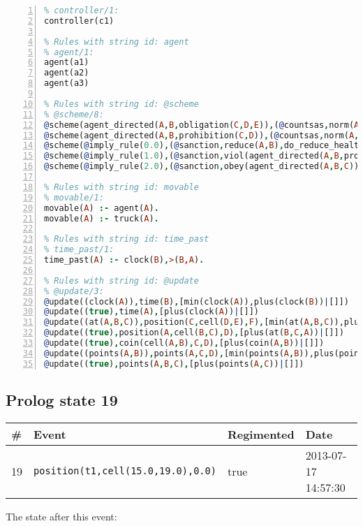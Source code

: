 \documentclass[11pt]{article}\usepackage[utf8]{inputenc}\usepackage{geometry}
\begin{document}
\begin{lstlisting}[language=Prolog, numbers=left]
% Rules with string id: controller
% controller/1:
controller(c1)

% Rules with string id: agent
% agent/1:
agent(a1)
agent(a2)
agent(a3)

% Rules with string id: @scheme
% @scheme/8:
@scheme(agent_directed(A,B,obligation(C,D,E)),(@countsas,norm(A,B,F,obligation(C,D,E)),F),false,(listTrue(C)),(time_past(D)),false,[plus(viol(agent_directed(A,B,obligation(C,D,E))))|[]],[plus(obey(agent_directed(A,B,obligation(C,D,E))))|[]])
@scheme(agent_directed(A,B,prohibition(C,D)),(@countsas,norm(A,B,E,prohibition(C,D)),E),(listTrue(C)),false,(false),false,[plus(viol(agent_directed(A,B,prohibition(C,D))))|[]],[plus(obey(agent_directed(A,B,prohibition(C,D))))|[]])
@scheme(@imply_rule(0.0),(@sanction,reduce(A,B),do_reduce_health(A,B),notifyAgent(A,changed(status))),true,false,false,false,[min(reduce(A,B))|[]],[])
@scheme(@imply_rule(1.0),(@sanction,viol(agent_directed(A,B,prohibition(C,D))),do_sanction(D)),true,false,false,false,[min(viol(agent_directed(A,B,prohibition(C,D))))|[]],[])
@scheme(@imply_rule(2.0),(@sanction,obey(agent_directed(A,B,C))),true,false,false,false,[min(obey(agent_directed(A,B,C)))|[]],[])

% Rules with string id: movable
% movable/1:
movable(A) :- agent(A).
movable(A) :- truck(A).

% Rules with string id: time_past
% time_past/1:
time_past(A) :- clock(B),>(B,A).

% Rules with string id: @update
% @update/3:
@update((clock(A)),time(B),[min(clock(A)),plus(clock(B))|[]])
@update((true),time(A),[plus(clock(A))|[]])
@update((at(A,B,C)),position(C,cell(D,E),F),[min(at(A,B,C)),plus(at(D,E,C))|[]])
@update((true),position(A,cell(B,C),D),[plus(at(B,C,A))|[]])
@update((true),coin(cell(A,B),C,D),[plus(coin(A,B))|[]])
@update((points(A,B)),points(A,C,D),[min(points(A,B)),plus(points(A,D))|[]])
@update((true),points(A,B,C),[plus(points(A,C))|[]])

\end{lstlisting}
\clearpage 
\subsection{Prolog state 19}
\begin{table}[ht]
\centering 
\begin{tabular}{l l l l} 
\textbf{\#} & \textbf{Event} & \textbf{Regimented} & \textbf{Date} \\ [0.5ex] 
\hline
19&\texttt{position(t1,cell(15.0,19.0),0.0)}&true&2013-07-17 14:57:30\\ [1ex] \hline\end{tabular}
\end{table}
The state after this event:
\end{document}
